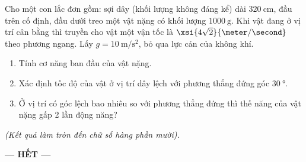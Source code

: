 \begin{ex}
	Cho một con lắc đơn gồm: sợi dây (khối lượng không đáng kể) dài $\SI{320}{\centi \meter}$, đầu trên cố định, đầu dưới treo một vật nặng có khối lượng $\SI{1000}{\gram}$. Khi vật đang ở vị trí cân bằng thì truyền cho vật một vận tốc là $\xsi{4\sqrt{2}}{\meter/\second}$ theo phương ngang. Lấy $g=\SI{10}{\meter / \second \squared}$, bỏ qua lực cản của không khí. 
	\begin{enumerate}[label=\alph*)]
		\item Tính cơ năng ban đầu của vật nặng.
		\item Xác định tốc độ của vật ở vị trí dây lệch với phương thẳng đứng góc $\SI{30}{\degree}$.
		\item Ở vị trí có góc lệch bao nhiêu so với phương thẳng đứng thì thế năng của vật nặng gấp 2 lần động năng?
	\end{enumerate}
	\textit{(Kết quả làm tròn đến chữ số hàng phần mười).}
\end{ex}
\begin{center}
	\textbf{--- HẾT ---}
\end{center}